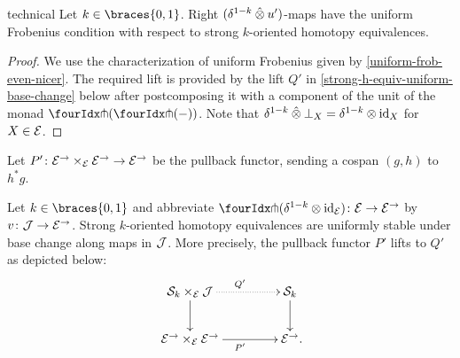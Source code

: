 \documentclass[reqno,10pt,a4paper,oneside,draft]{amsart}
\begin{document}
\begin{replemma}{technical}
Let $k \in \braces{0, 1}$.
Right $(\delta^{1-k} \hatotimes u')$-maps have the uniform Frobenius condition with respect to strong $k$-oriented homotopy equivalences.
\end{replemma}

\begin{proof}
We use the characterization of uniform Frobenius given by \cref{uniform-frob-even-nicer}.
The required lift is provided by the lift $Q'$ in \cref{strong-h-equiv-uniform-base-change} below after postcomposing it with a component of the unit of the monad $\liftl{(\liftr{(-)})}$.
Note that $\delta^{1-k} \hatotimes \bot_X = \delta^{1-k} \otimes \id_X$ for $X \in \cal{E}$.
\end{proof}

Let $P' \co \cal{E}^\to \times_{\cal{E}} \cal{E}^\to \to \cal{E}^\to$ be the pullback functor, sending a cospan $(g, h)$ to $h^* g$.

\begin{lemma} \label{strong-h-equiv-uniform-base-change}
Let $k \in \braces{0, 1}$ and abbreviate $\liftr{(\kcylinv \otimes \id_{\cal{E}})} \co \cal{E} \to \cal{E}^\to$ by $v \co \cal{J} \to \cal{E}^\to$.
Strong $k$-oriented homotopy equivalences are uniformly stable under base change along maps in $\cal{J}$.
More precisely, the pullback functor $P'$ lifts to $Q'$ as depicted below:
\begin{equation} \label{strong-h-equiv-uniform-base-change:goal}
\begin{gathered}
\xymatrix@C+2em{
  \cal{S}_k \times_{\cal{E}} \cal{J}
  \ar@{.>}[r]^{Q'}
  \ar[d]
&
  \cal{S}_k
  \ar[d]
\\
  \cal{E}^\to \times_{\cal{E}} \cal{E}^\to
  \ar[r]_{P'}
&
  \cal{E}^\to
\rlap{.}}
\end{gathered}
\end{equation}
\end{lemma}
\end{document}
